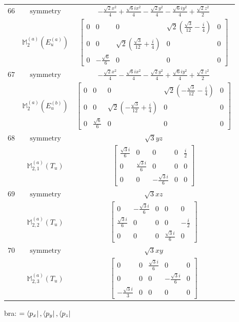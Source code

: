 \documentclass[fleqn,8pt,landscape]{jsarticle}
\begin{document}
\begin{longtable}{ccc}
$ 66 $ & $ \text{symmetry} $ & $ - \frac{\sqrt{2} x^{2}}{4} + \frac{\sqrt{6} i x^{2}}{4} - \frac{\sqrt{2} y^{2}}{4} - \frac{\sqrt{6} i y^{2}}{4} + \frac{\sqrt{2} z^{2}}{2} $ \\
$  $ & $ \mathbb{M}_{2}^{(a)}(E_{u}^{(a)}) $ & $ \begin{bmatrix} 0 & 0 & 0 & \sqrt{2} \left(\frac{\sqrt{3}}{12} - \frac{i}{4}\right) & 0 \\ 0 & 0 & \sqrt{2} \left(\frac{\sqrt{3}}{12} + \frac{i}{4}\right) & 0 & 0 \\ 0 & - \frac{\sqrt{6}}{6} & 0 & 0 & 0 \end{bmatrix} $ \\ \hline
$ 67 $ & $ \text{symmetry} $ & $ - \frac{\sqrt{2} x^{2}}{4} - \frac{\sqrt{6} i x^{2}}{4} - \frac{\sqrt{2} y^{2}}{4} + \frac{\sqrt{6} i y^{2}}{4} + \frac{\sqrt{2} z^{2}}{2} $ \\
$  $ & $ \mathbb{M}_{2}^{(a)}(E_{u}^{(b)}) $ & $ \begin{bmatrix} 0 & 0 & 0 & \sqrt{2} \left(- \frac{\sqrt{3}}{12} - \frac{i}{4}\right) & 0 \\ 0 & 0 & \sqrt{2} \left(- \frac{\sqrt{3}}{12} + \frac{i}{4}\right) & 0 & 0 \\ 0 & \frac{\sqrt{6}}{6} & 0 & 0 & 0 \end{bmatrix} $ \\ \hline
$ 68 $ & $ \text{symmetry} $ & $ \sqrt{3} y z $ \\
$  $ & $ \mathbb{M}_{2,1}^{(a)}(T_{u}) $ & $ \begin{bmatrix} \frac{\sqrt{3} i}{6} & 0 & 0 & 0 & \frac{i}{2} \\ 0 & \frac{\sqrt{3} i}{6} & 0 & 0 & 0 \\ 0 & 0 & - \frac{\sqrt{3} i}{6} & 0 & 0 \end{bmatrix} $ \\ \hline
$ 69 $ & $ \text{symmetry} $ & $ \sqrt{3} x z $ \\
$  $ & $ \mathbb{M}_{2,2}^{(a)}(T_{u}) $ & $ \begin{bmatrix} 0 & - \frac{\sqrt{3} i}{6} & 0 & 0 & 0 \\ \frac{\sqrt{3} i}{6} & 0 & 0 & 0 & - \frac{i}{2} \\ 0 & 0 & 0 & \frac{\sqrt{3} i}{6} & 0 \end{bmatrix} $ \\ \hline
$ 70 $ & $ \text{symmetry} $ & $ \sqrt{3} x y $ \\
$  $ & $ \mathbb{M}_{2,3}^{(a)}(T_{u}) $ & $ \begin{bmatrix} 0 & 0 & \frac{\sqrt{3} i}{6} & 0 & 0 \\ 0 & 0 & 0 & - \frac{\sqrt{3} i}{6} & 0 \\ - \frac{\sqrt{3} i}{3} & 0 & 0 & 0 & 0 \end{bmatrix} $ \\ \hline
\end{longtable}
bra: $=\bra{p_{x}}, \bra{p_{y}}, \bra{p_{z}}$
\end{document}
